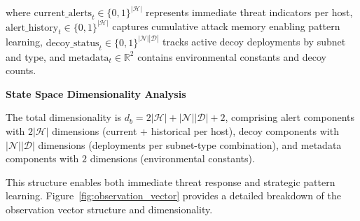 \documentclass[12pt,oneside]{article}
\begin{document}
where $\text{current\_alerts}_t \in \{0,1\}^{|\mathcal{H}|}$ represents immediate threat indicators per host, $\text{alert\_history}_t \in \{0,1\}^{|\mathcal{H}|}$ captures cumulative attack memory enabling pattern learning, $\text{decoy\_status}_t \in \{0,1\}^{|\mathcal{N}||\mathcal{D}|}$ tracks active decoy deployments by subnet and type, and $\text{metadata}_t \in \mathbb{R}^2$ contains environmental constants and decoy counts.

\textbf{State Space Dimensionality Analysis}

The total dimensionality is $d_b = 2|\mathcal{H}| + |\mathcal{N}||\mathcal{D}| + 2$, comprising alert components with $2|\mathcal{H}|$ dimensions (current + historical per host), decoy components with $|\mathcal{N}||\mathcal{D}|$ dimensions (deployments per subnet-type combination), and metadata components with $2$ dimensions (environmental constants).

This structure enables both immediate threat response and strategic pattern learning. Figure~\ref{fig:observation_vector} provides a detailed breakdown of the observation vector structure and dimensionality.
\end{document}
